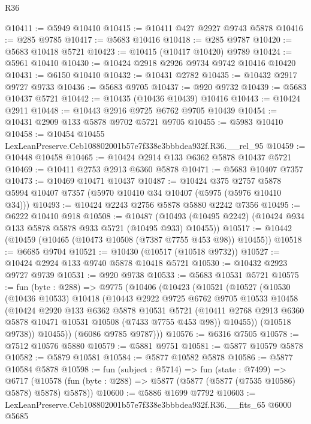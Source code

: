 \begin{lexlean}{R36}
\begin{coremodule}
@10411 := @5949 @10410
@10415 := @10411 @427 @2927 @9743 @5878
@10416 := @285 @9785
@10417 := @5683 @10416
@10418 := @285 @9787
@10420 := @5683 @10418 @5721
@10423 := @10415 (@10417 @10420) @9789
@10424 := @5961 @10410
@10430 := @10424 @2918 @2926 @9734 @9742 @10416 @10420
@10431 := @6150 @10410
@10432 := @10431 @2782
@10435 := @10432 @2917 @9727 @9733
@10436 := @5683 @9705
@10437 := @920 @9732
@10439 := @5683 @10437 @5721
@10442 := @10435 (@10436 @10439) @10416
@10443 := @10424 @2911
@10448 := @10443 @2916 @9725 @6762 @9705 @10439
@10454 := @10431 @2909 @133 @5878 @9702 @5721 @9705
@10455 := @5983 @10410
@10458 := @10454 @10455 LexLeanPreserve.Ceb108802001b57e7f338e3bbbdea932f.R36.__rel_95
@10459 := @10448 @10458
@10465 := @10424 @2914 @133 @6362 @5878 @10437 @5721
@10469 := @10411 @2753 @2913 @6360 @5878
@10471 := @5683 @10407 @7357
@10473 := @10469 @10471 @10437
@10487 := @10424
    @375
    @2757
    @5878
    @5994
    @10407
    @7357
    (@5970 @10410 @34 @10407 (@5975 (@5976 @10410 @34)))
@10493 := @10424 @2243 @2756 @5878 @5880 @2242 @7356
@10495 := @6222 @10410 @918
@10508 := @10487
    (@10493 (@10495 @2242) (@10424 @934 @133 @5878 @5878 @933 @5721 (@10495 @933) @10455))
@10517 := @10442 (@10459 (@10465 (@10473 @10508 (@7387 @7755 @453 @98)) @10455))
@10518 := @6685 @9704
@10521 := @10430 (@10517 (@10518 @9732))
@10527 := @10424 @2924 @133 @9740 @5878 @10418 @5721
@10530 := @10432 @2923 @9727 @9739
@10531 := @920 @9738
@10533 := @5683 @10531 @5721
@10575 := fun (byte : @288) =>
  @9775
    (@10406
      (@10423
        (@10521
          (@10527
            (@10530
              (@10436 @10533)
              @10418
              (@10443
                @2922
                @9725
                @6762
                @9705
                @10533
                @10458
                (@10424
                  @2920
                  @133
                  @6362
                  @5878
                  @10531
                  @5721
                  (@10411 @2768 @2913 @6360 @5878 @10471 @10531 @10508 (@7433 @7755 @453 @98))
                  @10455))
              (@10518 @9738))
            @10455))
        (@6086 @9785 @9787)))
@10576 := @6316 @7505
@10578 := @7512 @10576 @5880
@10579 := @5881 @9751
@10581 := @5877 @10579 @5878
@10582 := @5879 @10581
@10584 := @5877 @10582 @5878
@10586 := @5877 @10584 @5878
@10598 := fun (subject : @5714) =>
  fun (state : @7499) =>
  @6717 (@10578 (fun (byte : @288) => @5877 (@5877 (@5877 (@7535 @10586) @5878) @5878) @5878))
@10600 := @5886 @1699 @7792
@10603 := LexLeanPreserve.Ceb108802001b57e7f338e3bbbdea932f.R36.__fits_65 @6000 @5685

\end{coremodule}
\end{lexlean}
